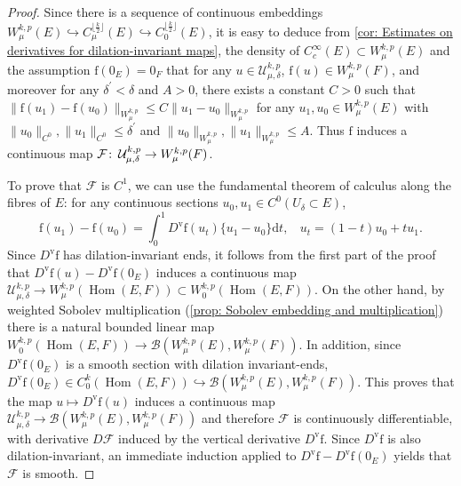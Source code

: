 \documentclass{article}
\numberwithin{equation}{section}        %
\theoremstyle{bfnote}
\theoremstyle{definition}
\theoremstyle{bfremark}
\newcommand{\col}{\colon \thinspace}        %
\newcommand{\diff}{\mathrm{d}}                      %
\newcommand{\bmap}[1]{\boldsymbol{\mathrm{#1}}}     %
\DeclareMathOperator{\Hom}{Hom}                 %
\begin{document}
\begin{proof}
    Since there is a sequence of continuous embeddings $W^{k,p}_\mu(E) \hookrightarrow C^{\lfloor \frac{k}{2} \rfloor}_\mu(E) \hookrightarrow C^{\lfloor \frac{k}{2} \rfloor}_0(E)$, it is easy to deduce from \cref{cor: Estimates on derivatives for dilation-invariant maps}, the density of $C^\infty_c(E) \subset W^{k,p}_\mu(E)$ and the assumption $\bmap{f}(0_E) = 0_F$ that for any $u \in \mathcal{U}^{k,p}_{\mu,\delta}$, $\bmap{f}(u) \in W^{k,p}_\mu(F)$, and moreover for any $\delta^\prime < \delta$ and $A > 0$, there exists a constant $C > 0$ such that $\|\bmap{f}(u_1)-\bmap{f}(u_0)\|_{W^{k,p}_\mu} \leq C \|u_1-u_0\|_{W^{k,p}_\mu}$ for any $u_1,u_0 \in W^{k,p}_\mu(E)$ with $\|u_0\|_{C^{0}}, \|u_1\|_{C^0} \leq \delta^\prime$ and $\|u_0\|_{W^{k,p}_\mu}, \|u_1\|_{W^{k,p}_\mu} \leq A$. Thus $\bmap{f}$ induces a continuous map $\mathcal{F} \col \mathcal{U}^{k,p}_{\mu,\delta} \to W^{k,p}_\mu(F)$.
    
    To prove that $\mathcal{F}$ is $C^1$, we can use the fundamental theorem of calculus along the fibres of $E$: for any continuous sections $u_0, u_1 \in C^0(U_\delta \subset E)$,
    \begin{equation*}
        \bmap{f}(u_1) - \bmap{f}(u_0) = \int_0^1 D^{\mathrm{v}} \bmap{f}(u_t) \{u_1-u_0\} \diff t, ~~~~ u_t = (1-t)u_0 + t u_1 .
    \end{equation*}
    Since $D^{\mathrm{v}} \bmap{f}$ has dilation-invariant ends, it follows from the first part of the proof that $D^{\mathrm{v}} \bmap{f}(u) - D^{\mathrm{v}} \bmap{f}(0_E)$ induces a continuous map $\mathcal{U}^{k,p}_{\mu,\delta} \to W^{k,p}_\mu(\Hom(E,F)) \subset W^{k,p}_0(\Hom(E,F))$. On the other hand, by weighted Sobolev multiplication (\cref{prop: Sobolev embedding and multiplication}) there is a natural bounded linear map $W^{k,p}_0(\Hom(E,F)) \to \mathcal{B}(W^{k,p}_\mu(E), W^{k,p}_\mu(F))$. In addition, since $D^{\mathrm{v}} \bmap{f}(0_E)$ is a smooth section with dilation invariant-ends, $D^{\mathrm{v}} \bmap{f}(0_E) \in C^k_0(\Hom(E,F)) \hookrightarrow \mathcal{B}(W^{k,p}_\mu(E), W^{k,p}_\mu(F))$. This proves that the map $u \mapsto D^{\mathrm{v}} \bmap{f}(u)$ induces a continuous map $\mathcal{U}^{k,p}_{\mu,\delta} \to \mathcal{B}(W^{k,p}_\mu(E),W^{k,p}_\mu(F))$ and therefore $\mathcal{F}$ is continuously differentiable, with derivative $D \mathcal{F}$ induced by the vertical derivative $D^{\mathrm{v}} \bmap{f}$. Since $D^{\mathrm{v}} \bmap{f}$ is also dilation-invariant, an immediate induction applied to $D^{\mathrm{v}} \bmap{f} - D^{\mathrm{v}} \bmap{f}(0_E)$ yields that $\mathcal{F}$ is smooth.
\end{proof}
\end{document}
